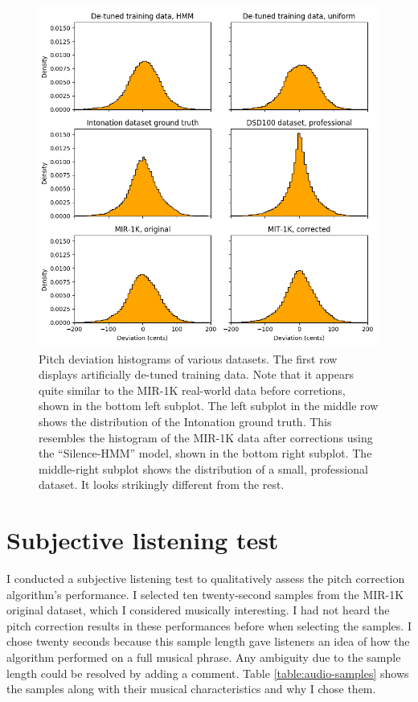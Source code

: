 \begin{figure}[t]
    \centering
    \includegraphics[width=\columnwidth]{figures/dataset-comparison.png}
    \caption{Pitch deviation histograms of various datasets. The first row displays artificially de-tuned training data. Note that it appears quite similar to the MIR-1K real-world data before corretions, shown in the bottom left subplot. The left subplot in the middle row shows the distribution of the Intonation ground truth. This resembles the histogram of the MIR-1K data after corrections using the ``Silence-HMM'' model, shown in the bottom right subplot. The middle-right subplot shows the distribution of a small, professional dataset. It looks strikingly different from the rest.}
    \label{fig:dataset-comparison}
\end{figure}



\section{Subjective listening test}
\label{sec:subjective-test}
I conducted a subjective listening test to qualitatively assess the pitch correction algorithm's performance. I selected ten twenty-second samples from the MIR-1K original dataset, which I considered musically interesting. I had not heard the pitch correction results in these performances before when selecting the samples. I chose twenty seconds because this sample length gave listeners an idea of how the algorithm performed on a full musical phrase. Any ambiguity due to the sample length could be resolved by adding a comment. Table \ref{table:audio-samples} shows the samples along with their musical characteristics and why I chose them. 

